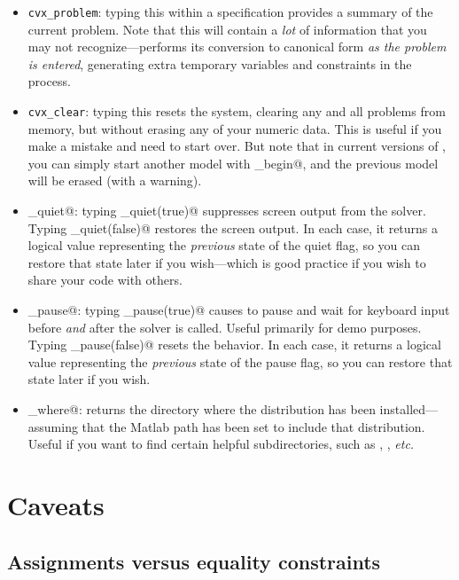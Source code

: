 \documentclass[12pt]{article}
\begin{document}
\begin{itemize}
\item \verb+cvx_problem+: typing this within a \cvx specification provides a summary
of the current problem. Note that this will contain a \emph{lot} of information
that you may not recognize---\cvx performs its conversion to canonical form
\emph{as the problem is entered}, generating extra temporary variables and
constraints in the process.
\item \verb+cvx_clear+: typing this resets the \cvx system, clearing any and all problems
from memory, but without erasing any of your numeric data.
This is useful if you make a mistake and need to start over. But note that in current
versions of \cvx, you can simply start another model with \verb@cvx_begin@, and
the previous model will be erased (with a warning).
\item \verb@cvx_quiet@: typing \verb@cvx_quiet(true)@ suppresses screen
output from the solver. Typing \verb@cvx_quiet(false)@ restores the screen
output. In each case, it returns a logical value representing the \emph{previous}
state of the quiet flag, so you can restore that state later if you wish---which
is good practice if you wish to share your code with others.
\item \verb@cvx_pause@: typing \verb@cvx_pause(true)@ causes \cvx to pause and
wait for keyboard input before \emph{and} after the solver is called. Useful
primarily for demo purposes. Typing \verb@cvx_pause(false)@ resets the behavior.
In each case, it returns a logical value representing the \emph{previous} state
of the pause flag, so you can restore that state later if you wish.
\item \verb@cvx_where@: returns the directory where the \cvx distribution
has been installed---assuming that the Matlab path has been set to include
that distribution. Useful if you want to find certain helpful subdirectories,
such as \verb@doc@, \verb@examples@, \emph{etc.}
\end{itemize}

\section{Caveats}

\subsection{Assignments versus equality constraints}
\label{sec:eqass}
\end{document}
